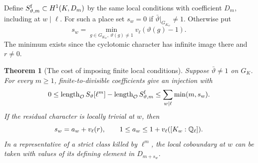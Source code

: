 \documentclass[a4paper,11pt]{article}
\newtheorem{theorem}[proposition]{Theorem}
\theoremstyle{definition}
\theoremstyle{remark}
\newcommand{\len}{\operatorname{length}}\newcommand{\Res}{\operatorname*{Res}}
\numberwithin{equation}{section}
\newcommand{\OO}{\mathcal O}
\begin{document}
Define \(S_{\vartheta,m}^{\rm f}\subset H^1(K,D_m)\) by the same local conditions with coefficient \(D_m\), including at \(w\mid\ell\). For such a place set \(s_w=0\) if \(\bar\vartheta|_{G_{K_w}}\ne1\). Otherwise put
\[
 s_w=\min_{g\in G_{K_w},\ \vartheta(g)\ne1}v_\ell(\vartheta(g)-1).
\]
The minimum exists since the cyclotomic character has infinite image there and \(r\ne0\).

\begin{theorem}[The cost of imposing finite local conditions]\label{thm:finite31}
Suppose \(\bar\vartheta\ne1\) on \(G_K\). For every \(m\ge1\), finite-to-divisible coefficients give an injection with
\begin{equation}
 0\le\len_{\OO}S_\vartheta[\ell^m]-\len_{\OO}S_{\vartheta,m}^{\rm f}
       \le\sum_{w\mid\ell}\min(m,s_w).                        \label{eq:loss31}
\end{equation}
If the residual character is locally trivial at \(w\), then
\[
  s_w= a_w+v_\ell(r),\qquad
  1\le a_w\le 1+v_\ell([K_w:\mathbb Q_\ell]).
\]
In a representative of a strict class killed by \(\ell^m\), the local coboundary at \(w\) can be taken with values of its defining element in \(D_{m+s_w}\).
\end{theorem}
\end{document}
